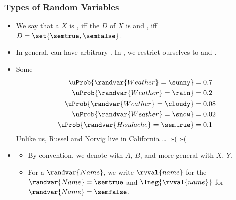 \documentclass[notes,mh]{mikoslides}
\begin{document}
\begin{module}[id=unconditional-prob]
\begin{frame}
  \frametitle{Types of Random Variables}
  \begin{itemize}
  \item
    \begin{definition}
      We say that a  $X$ is
      , iff the  $D$ of $X$ is
       and , iff
      $D=\set{\semtrue,\semfalse}$.
    \end{definition}
  \item 
    \begin{omtext}[title=Note]
      In general,  can have arbitrary . In
      , we restrict ourselves to  and
       .
    \end{omtext}
  \item
    \begin{module}[id=weather-ex]
       
       
      \begin{example}
        Some 
        \begin{align*}
          \uProb{\randvar{Weather}=\sunny}      &= 0.7 \\
          \uProb{\randvar{Weather}=\rain}       &= 0.2 \\
          \uProb{\randvar{Weather}=\cloudy}     &= 0.08 \\
          \uProb{\randvar{Weather}=\snow}       &= 0.02 \\
          \uProb{\randvar{Headache}=\semtrue}      &= 0.1
        \end{align*}
        Unlike us, Russel and Norvig live in California \dots\ :-( :-(
      \end{example}
    \end{module}
  \item
    \begin{omtext}[title=Convenience Notations]
      \begin{itemize}
      \item By convention, we denote 
         with $A$, $B$, and more general
          with $X$,
        $Y$.
      \item For a  
        $\randvar{Name}$, we write $\rvval{name}$ for the
         $\randvar{Name} = \semtrue$ and
        $\lneg{\rvval{name}}$ for $\randvar{Name} = \semfalse$. 
    \end{itemize}
  \end{omtext}
\end{itemize}
\end{frame}
\end{module}
\end{document}

